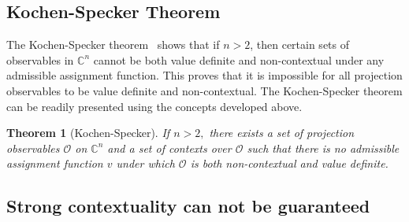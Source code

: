 \documentclass[%
 preprint,
 showpacs,
 showkeys,
 amsmath,
 amssymb,
 aps,
 pra,
 ]{revtex4-1}
\newtheorem{Theorem}{Theorem}
\theoremstyle{definition}
\begin{document}
\subsection{Kochen-Specker Theorem}

The Kochen-Specker theorem~\cite{kochen1} shows that if $n>2$, then certain sets of observables in $\mathbb{C}^n$
cannot be both value definite and non-contextual under any admissible assignment function.
This proves that it is impossible for all projection observables to be value definite and non-contextual.
The Kochen-Specker theorem can be readily presented using the concepts developed above.\\

\begin{Theorem}[Kochen-Specker]
	If $n>2,$ there exists a set of projection observables $\mathcal{O}$ on $\mathbb{C}^n$ and a set of contexts over $\mathcal{O}$ such that there is no admissible assignment function $v$ under which $\mathcal{O}$ is both non-contextual and value definite.
\end{Theorem}

\subsection{Strong contextuality can not be guaranteed}
\end{document}
